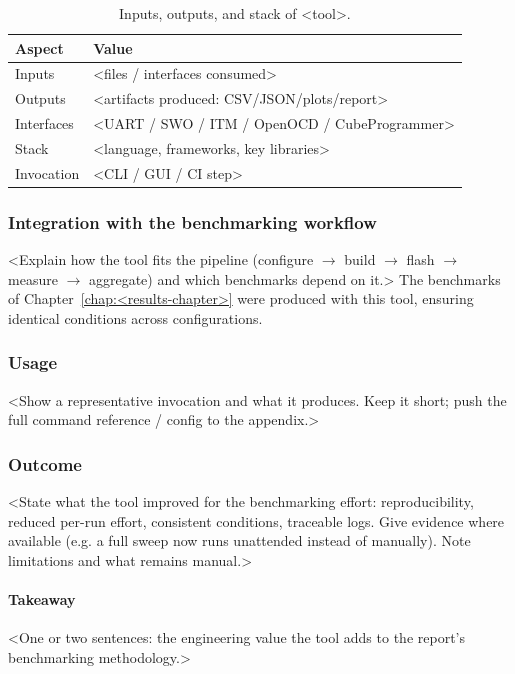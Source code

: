 \begin{table}[H]
  \centering
  \begin{tabular}{l l}
    \toprule
    Aspect & Value \\
    \midrule
    Inputs        & <files / interfaces consumed> \\
    Outputs       & <artifacts produced: CSV/JSON/plots/report> \\
    Interfaces    & <UART / SWO / ITM / OpenOCD / CubeProgrammer> \\
    Stack         & <language, frameworks, key libraries> \\
    Invocation    & <CLI / GUI / CI step> \\
    \bottomrule
  \end{tabular}
  \caption{Inputs, outputs, and stack of <tool>.}
  \label{tab:<tool-key>-io}
\end{table}

\subsubsection{Integration with the benchmarking workflow}
<Explain how the tool fits the pipeline (configure $\rightarrow$ build $\rightarrow$ flash
$\rightarrow$ measure $\rightarrow$ aggregate) and which benchmarks depend on it.>
The benchmarks of Chapter~\ref{chap:<results-chapter>} were produced with this tool,
ensuring identical conditions across configurations.

\subsubsection{Usage}
<Show a representative invocation and what it produces. Keep it short; push the
full command reference / config to the appendix.>

\subsubsection{Outcome}
<State what the tool improved for the benchmarking effort: reproducibility,
reduced per-run effort, consistent conditions, traceable logs. Give evidence
where available (e.g. a full sweep now runs unattended instead of manually).
Note limitations and what remains manual.>

\paragraph{Takeaway} <One or two sentences: the engineering value the tool adds
to the report's benchmarking methodology.>
